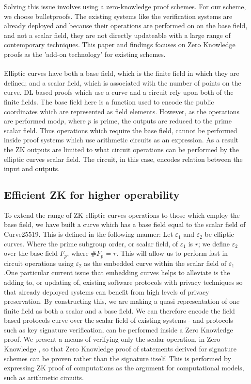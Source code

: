 \documentclass{article}
\theoremstyle{definition}
\theoremstyle{remark}
\begin{document}
	Solving this issue involves using a zero-knowledge proof schemes. For our scheme, we choose bulletproofs. The existing systems like the verification systems are already deployed and because their operations are performed on on the base field, and not a scalar field, they are not directly updateable with a large range of contemporary techniques. This paper and findings focuses on Zero Knowledge  proofs as the 'add-on technology' for existing schemes. \\\\ 
	
	Elliptic curves have both a base field, which is the finite field in which they are defined; and a scalar field, which is associated with the number of points on the curve. DL based proofs which use a curve and a circuit rely upon both of the finite fields. The base field here is a function used to encode the public coordinates which are represented as field elements. However, as the operations are performed mod$p$, where $p$ is prime,  the outputs are reduced to the prime scalar field. Thus operations which require the base field, cannot be performed inside proof systems which use arithmetic circuits as an expression. As a result the ZK outputs are limited to what circuit operations can be performed by the elliptic curves scalar field. The circuit, in this case, encodes relation between the input and outputs.
	
	\subsection{Efficient ZK for higher operability}
	
	To extend the range of ZK elliptic curves operations to those which employ the base field, we have built a curve which has a base field equal to the scalar field of Curve25519. This is defined in the following manner: Let $\varepsilon_{1}$ and $\varepsilon_{2}$ be elliptic curves. Where the prime subgroup order, or scalar field, of $\varepsilon_{1}$ is $r$; we define $\varepsilon_{2}$ over the base field $F_p$, where \#$F_p$ = $r$. 
	This will allow us to perform fast in circuit operations using $\varepsilon_{2}$ as the embedded curve within the scalar field of $\varepsilon_{1}$.One particular current issue that embedding curves helps to alleviate is the adding to, or updating of, existing software protocols with privacy techniques so that already deployed systems can benefit from high levels of privacy preservation. By constructing this, we are making a quasi representation of one finite field as both a scalar and a base field. We can therefore encode the field based protocols curve over the scalar field of existing systems - and protocols such as key signature verification, can be performed inside a Zero Knowledge  proof. We present a means of verifying only the scalar operation, in Zero Knowledge , so that Zero Knowledge  proof of statements derived for signature schemes can be proven rather than the signature itself. This is performed by expressing ZK proof of computations as the argument for computational models, such as arithmetic circuits.\\\\ 
	
\end{document}
